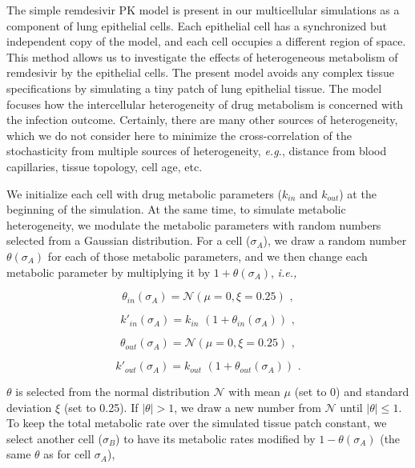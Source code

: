 The simple remdesivir PK model is present in our multicellular simulations as a component of lung epithelial cells. Each epithelial cell has a synchronized but independent copy of the model, and each cell occupies a different region of space. This method allows us to investigate the effects of heterogeneous metabolism of remdesivir by the epithelial cells. The present model avoids any complex tissue specifications by simulating a tiny patch of lung epithelial tissue. The model focuses how the intercellular heterogeneity of drug metabolism is concerned with the infection outcome. Certainly, there are many other sources of heterogeneity, which we do not consider here to minimize the cross-correlation of the stochasticity from multiple sources of heterogeneity, \textit{e.g.}, distance from blood capillaries, tissue topology, cell age, etc.

We initialize each cell with drug metabolic parameters ($k_{in}$ and $k_{out}$) at the beginning of the simulation. At the same time, to simulate metabolic heterogeneity, we modulate the metabolic parameters with random numbers selected from a Gaussian distribution. For a cell ($\sigma_A$), we draw a random number $\theta(\sigma_A)$ for each of those metabolic parameters, and we then change each metabolic parameter by multiplying it by $1+\theta(\sigma_A)$, \textit{i.e.,}

\begin{equation}\label{eq:remdes:intercell:kindraw}
    \theta_{in}(\sigma_A) = \mathcal{N}(\mu=0, \xi=0.25)\,\,,
\end{equation}

\begin{equation}\label{eq:remdes:intercell:mod_kin}
    k'_{in}(\sigma_A) = k_{in} \,\, (1+\theta_{in}(\sigma_A))\,\,,
\end{equation}

\begin{equation}\label{eq:remdes:intercell:koutdraw}
    \theta_{out}(\sigma_A) = \mathcal{N}(\mu=0, \xi=0.25)\,\,,
\end{equation}

\begin{equation}\label{eq:remdes:intercell:mod_kout}
    k'_{out}(\sigma_A) = k_{out} \,\, (1+\theta_{out}(\sigma_A))\,\,.
\end{equation}

\noindent
$\theta$ is selected from the normal distribution $\mathcal{N}$ with mean $\mu$ (set to 0) and standard deviation $\xi$ (set to 0.25). If $|\theta| > 1$, we draw a new number from $\mathcal{N}$ until $|\theta| \leq 1$. To keep the total metabolic rate over the simulated tissue patch constant, we select another cell ($\sigma_B$) to have its metabolic rates modified by $1-\theta(\sigma_A)$ (the same $\theta$ as for cell $\sigma_A$),


